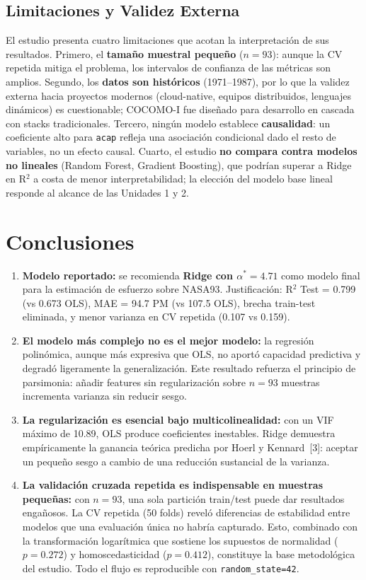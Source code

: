 \documentclass[11pt,a4paper]{article}
\begin{document}
\subsection{Limitaciones y Validez Externa}

El estudio presenta cuatro limitaciones que acotan la interpretación de sus resultados. Primero, el \textbf{tamaño muestral pequeño} ($n=93$): aunque la CV repetida mitiga el problema, los intervalos de confianza de las métricas son amplios. Segundo, los \textbf{datos son históricos} (1971--1987), por lo que la validez externa hacia proyectos modernos (cloud-native, equipos distribuidos, lenguajes dinámicos) es cuestionable; COCOMO-I fue diseñado para desarrollo en cascada con stacks tradicionales. Tercero, ningún modelo establece \textbf{causalidad}: un coeficiente alto para \texttt{acap} refleja una asociación condicional dado el resto de variables, no un efecto causal. Cuarto, el estudio \textbf{no compara contra modelos no lineales} (Random Forest, Gradient Boosting), que podrían superar a Ridge en R$^2$ a costa de menor interpretabilidad; la elección del modelo base lineal responde al alcance de las Unidades 1 y 2.

\section{Conclusiones}

\begin{enumerate}[itemsep=3pt,leftmargin=1.5em]
\item \textbf{Modelo reportado:} se recomienda \textbf{Ridge con $\alpha^{*}=4.71$} como modelo final para la estimación de esfuerzo sobre NASA93. Justificación: R$^2$ Test = 0.799 (vs 0.673 OLS), MAE = 94.7 PM (vs 107.5 OLS), brecha train-test eliminada, y menor varianza en CV repetida (0.107 vs 0.159).

\item \textbf{El modelo más complejo no es el mejor modelo:} la regresión polinómica, aunque más expresiva que OLS, no aportó capacidad predictiva y degradó ligeramente la generalización. Este resultado refuerza el principio de parsimonia: añadir features sin regularización sobre $n=93$ muestras incrementa varianza sin reducir sesgo.

\item \textbf{La regularización es esencial bajo multicolinealidad:} con un VIF máximo de 10.89, OLS produce coeficientes inestables. Ridge demuestra empíricamente la ganancia teórica predicha por Hoerl y Kennard~[3]: aceptar un pequeño sesgo a cambio de una reducción sustancial de la varianza.

\item \textbf{La validación cruzada repetida es indispensable en muestras pequeñas:} con $n=93$, una sola partición train/test puede dar resultados engañosos. La CV repetida (50 folds) reveló diferencias de estabilidad entre modelos que una evaluación única no habría capturado. Esto, combinado con la transformación logarítmica que sostiene los supuestos de normalidad ($p=0.272$) y homoscedasticidad ($p=0.412$), constituye la base metodológica del estudio. Todo el flujo es reproducible con \texttt{random\_state=42}.
\end{enumerate}
\end{document}

